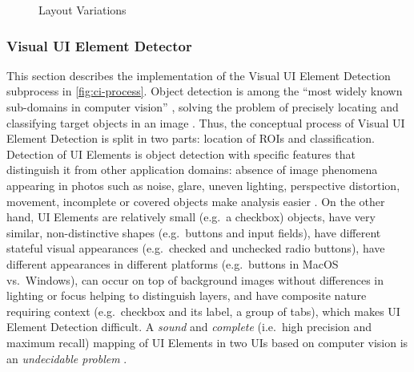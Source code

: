 \begin{figure}
\centering



\caption{Layout Variations}

\label{fig:orientation}

\end{figure}

\hypertarget{sec:segmentation.impl}{%
\subsubsection{Visual UI Element Detector}\label{sec:segmentation.impl}}

This section describes the implementation of the Visual UI Element Detection subprocess in \cref{fig:ci-process}.
Object detection is among the ``most widely known sub-domains in computer vision'' \autocite{Liu2017DNNSurvey}, solving the problem of precisely locating and classifying target objects in an image \autocite{Liu2017DNNSurvey}.
Thus, the conceptual process of Visual UI Element Detection is split in two parts: location of ROIs and classification.
Detection of UI Elements is object detection with specific features that distinguish it from other application domains: absence of image phenomena appearing in photos such as noise, glare, uneven lighting, perspective distortion, movement, incomplete or covered objects make analysis easier \autocite{Bakaev2019JWE}.
On the other hand, UI Elements are relatively small (e.g.~a checkbox) objects, have very similar, non-distinctive shapes (e.g.~buttons and input fields), have different stateful visual appearances (e.g.~checked and unchecked radio buttons), have different appearances in different platforms (e.g.~buttons in MacOS vs.~Windows), can occur on top of background images without differences in lighting or focus helping to distinguish layers, and have composite nature requiring context (e.g.~checkbox and its label, a group of tabs), which makes UI Element Detection difficult.
A \emph{sound} and \emph{complete} (i.e.~high precision and maximum recall) mapping of UI Elements in two UIs based on computer vision is an \emph{undecidable problem} \autocite{Grechanik2018}.

